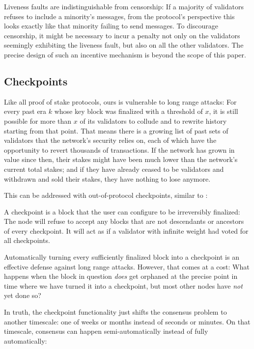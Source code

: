 \documentclass[12pt, fleqn]{article}
\begin{document}
Liveness faults are indistinguishable from censorship: If a majority of validators refuses to include a minority's messages, from the protocol's perspective this looks exactly like that minority failing to send messages. To discourage censorship, it might be necessary to incur a penalty not only on the validators seemingly exhibiting the liveness fault, but also on all the other validators. The precise design of such an incentive mechanism is beyond the scope of this paper.


\subsection{Checkpoints}
\label{sectionCheckpoints}

Like all proof of stake protocols, ours is vulnerable to long range attacks: For every past era $k$ whose key block was finalized with a threshold of $x$, it is still possible for more than $x$ of its validators to collude and to rewrite history starting from that point. That means there is a growing list of past sets of validators that the network's security relies on, each of which have the opportunity to revert thousands of transactions. If the network has grown in value since then, their stakes might have been much lower than the network's current total stakes; and if they have already ceased to be validators and withdrawn and sold their stakes, they have nothing to lose anymore.

This can be addressed with out-of-protocol checkpoints, similar to \cite{buterin2014subjectivity}:

A checkpoint is a block that the user can configure to be irreversibly finalized: The node will refuse to accept any blocks that are not descendants or ancestors of every checkpoint. It will act as if a validator with infinite weight had voted for all checkpoints.

Automatically turning every sufficiently finalized block into a checkpoint is an effective defense against long range attacks. However, that comes at a cost: What happens when the block in question \emph{does} get orphaned at the precise point in time where we have turned it into a checkpoint, but most other nodes have \emph{not} yet done so?

In truth, the checkpoint functionality just shifts the consensus problem to another timescale: one of weeks or months instead of seconds or minutes. On that timescale, consensus can happen semi-automatically instead of fully automatically:
\end{document}
